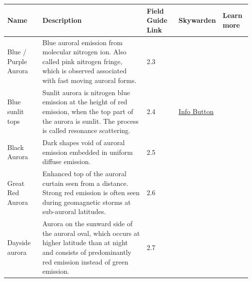 \documentclass{article}
\begin{document}
\begin{longtable}{|p{1.5cm}|p{6.5cm}|p{1cm}|p{1.75cm}|p{1.8cm}|}
\hline
\textbf{Name} & \textbf{Description} & \textbf{Field Guide Link} & \textbf{Skywarden} & \textbf{Learn more} \\
\hline
\endfirsthead
\endfoot
\hline
\endlastfoot

Blue / Purple Aurora & Blue auroral emission from molecular nitrogen ion. Also called pink nitrogen fringe, which is observed associated with fast moving auroral forms. & 2.3 &  &  \\
\hline
Blue sunlit tops & Sunlit aurora is nitrogen blue emission at the height of red emission, when the top part of the aurora is sunlit. The process is called resonance scattering. & 2.4 & \href{https://www.taivaanvahti.fi/observations/info/428/en}{Info Button} & \textcite{Shiokawa2019} \\
\hline
Black Aurora & Dark shapes void of auroral emission embedded in uniform diffuse emission. & 2.5 &  & \textcite{Trondsen1997} \\
\hline
Great Red Aurora & Enhanced top of the auroral curtain seen from a distance. Strong red emission is often seen during geomagnetic storms at sub-auroral latitudes. & 2.6 &  &  \\
\hline
Dayside aurora & Aurora on the sunward side of the auroral oval, which occurs at higher latitude than at night and consists of predominantly red emission instead of green emission. & 2.7 &  & \textcite{Frey2019} \\
\hline


\end{longtable}
\end{document}
